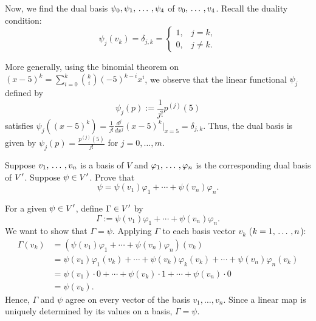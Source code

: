 \begin{xrcs}
\begin{xsol}
    Now, we find the dual basis $\psi_0, \psi_1, {\, \ldots \,\,}, \psi_4$ of $v_0, {\, \ldots \,\,}, v_4$. Recall the duality condition:
    \begin{equation}
      \psi_j (v_k) = \delta_{j,k} = \begin{cases}
        1, & j=k, \\
        0, & j \neq k.
      \end{cases}
    \end{equation}

    More generally, using the binomial theorem on $(x-5)^k = \sum_{i=0}^k \binom{k}{i} (-5)^{k-i} x^i$, we observe that the linear functional $\psi_j$ defined by
    \begin{equation}
      \psi_j(p) := \frac{1}{j!} p^{(j)}(5)
    \end{equation}
    satisfies $\psi_j((x-5)^k) = \frac{1}{j!} \frac{d^j}{dx^j}(x-5)^k\big|_{x=5} = \delta_{j,k}$.
    Thus, the dual basis is given by $\psi_j(p) = \frac{p^{(j)}(5)}{j!}$ for $j = 0, \dots, m$.
  \end{xsol}
\end{xrcs}

\begin{xrcs}
  Suppose $v_1, {\, \ldots \,\,}, v_n$ is a basis of $V$ and $\varphi_1, {\, \ldots \,\,}, \varphi_n$ is the corresponding dual basis of $\displaystyle V'$. Suppose $\psi \in \displaystyle V'$. Prove that
  \begin{equation}
     \label{eq: equation for psi}
     \psi = \psi(v_1) \varphi_1 + \cdots +  \psi(v_n) \varphi_n.
  \end{equation}

  \begin{xsol}
    For a given $\psi \in \displaystyle V'$, define $\Gamma \in \displaystyle V'$ by
    \begin{equation}
      \Gamma := \psi(v_1) \varphi_1 + \cdots +  \psi(v_n) \varphi_n.
    \end{equation}
    We want to show that $\Gamma = \psi$. Applying $\Gamma$ to each basis vector $v_k$ ($k = 1, {\, \ldots \,\,}, n$):
    \begin{equation}
      \begin{aligned}
        \Gamma(v_k) &= (\psi(v_1) \varphi_1 + \cdots +  \psi(v_n) \varphi_n) (v_k) \\
                    &= \psi(v_1) \varphi_1 (v_k) + \cdots +  \psi(v_k) \varphi_k (v_k) + \cdots +  \psi(v_n) \varphi_n (v_k) \\
                    &= \psi(v_1) \cdot 0 + \cdots +  \psi(v_k) \cdot 1 + \cdots +  \psi(v_n) \cdot 0 \\
                    &= \psi(v_k).
      \end{aligned}
    \end{equation}
    Hence, $\Gamma$ and $\psi$ agree on every vector of the basis $v_1, \dots, v_n$. Since a linear map is uniquely determined by its values on a basis, $\Gamma = \psi$.
  \end{xsol}
\end{xrcs}

